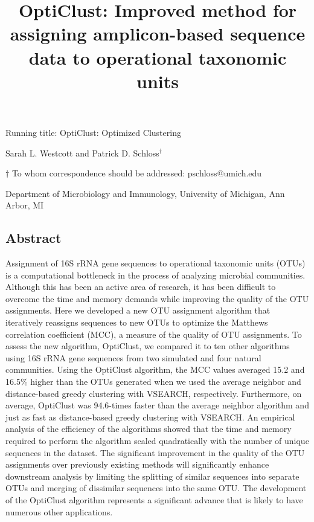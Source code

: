 \documentclass[11pt,]{article}
\title{\textbf{OptiClust: Improved method for assigning amplicon-based sequence
data to operational taxonomic units}}
\author{}
\date{}
\begin{document}
\maketitle

\begin{center}

Running title: OptiClust: Optimized Clustering


\vspace{25mm}
Sarah L. Westcott and Patrick D. Schloss${^\dagger}$

\vspace{30mm}

$\dagger$ To whom correspondence should be addressed: pschloss@umich.edu

Department of Microbiology and Immunology, University of Michigan, Ann Arbor, MI
\end{center}

\newpage

\linenumbers

\subsection{Abstract}\label{abstract}

Assignment of 16S rRNA gene sequences to operational taxonomic units
(OTUs) is a computational bottleneck in the process of analyzing
microbial communities. Although this has been an active area of
research, it has been difficult to overcome the time and memory demands
while improving the quality of the OTU assignments. Here we developed a
new OTU assignment algorithm that iteratively reassigns sequences to new
OTUs to optimize the Matthews correlation coefficient (MCC), a measure
of the quality of OTU assignments. To assess the new algorithm,
OptiClust, we compared it to ten other algorithms using 16S rRNA gene
sequences from two simulated and four natural communities. Using the
OptiClust algorithm, the MCC values averaged 15.2 and 16.5\% higher than
the OTUs generated when we used the average neighbor and distance-based
greedy clustering with VSEARCH, respectively. Furthermore, on average,
OptiClust was 94.6-times faster than the average neighbor algorithm and
just as fast as distance-based greedy clustering with VSEARCH. An
empirical analysis of the efficiency of the algorithms showed that the
time and memory required to perform the algorithm scaled quadratically
with the number of unique sequences in the dataset. The significant
improvement in the quality of the OTU assignments over previously
existing methods will significantly enhance downstream analysis by
limiting the splitting of similar sequences into separate OTUs and
merging of dissimilar sequences into the same OTU. The development of
the OptiClust algorithm represents a significant advance that is likely
to have numerous other applications.
\end{document}
